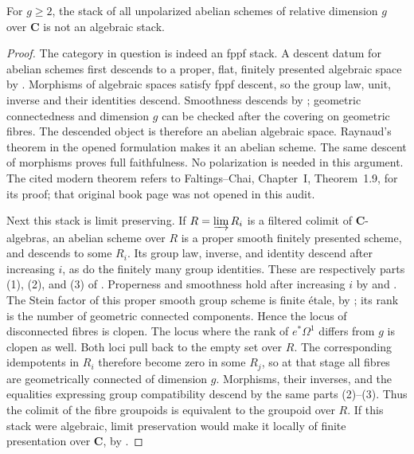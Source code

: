 \begin{proposition}
\label{geo-Ke-unpolarized}
For $g\geq2$, the stack of all unpolarized abelian schemes of relative
dimension $g$ over $\mathbf C$ is not an algebraic stack.
\end{proposition}
\begin{proof}
The category in question is indeed an fppf stack. A descent datum for
abelian schemes first descends to a proper, flat, finitely presented
algebraic space by \cite[Lemma 99.13.3, tag 0D1G]{geoStacksSpacesDescent}.
Morphisms of algebraic spaces satisfy fppf descent, so the group law,
unit, inverse and their identities descend. Smoothness descends by
\cite[Lemma 74.11.26, tag 0429]{geoStacksSmoothFpqc}; geometric
connectedness and dimension $g$ can be checked after the covering on
geometric fibres. The descended object is therefore an abelian algebraic
space. Raynaud's theorem in the opened formulation
\cite[Theorem 2.3.2, p.~12]{RobertAV2023} makes it an abelian scheme.
The same descent of morphisms proves full faithfulness. No polarization
is needed in this argument. The cited modern theorem refers to
Faltings--Chai, Chapter~I, Theorem~1.9, for its proof; that original book
page was not opened in this audit.

Next this stack is limit preserving. If $R=\varinjlim R_i$ is a filtered
colimit of $\mathbf C$-algebras, an abelian scheme over $R$ is a proper
smooth finitely presented scheme, and descends to some $R_i$. Its group
law, inverse, and identity descend after increasing $i$, as do the
finitely many group identities. These are respectively parts (1), (2),
and (3) of \cite[Lemma 32.10.1, tag 01ZM]{geoStacksFpDescent}.
Properness and smoothness hold after increasing $i$ by
\cite[Lemma 32.13.1, tag 081F]{geoStacksProperDescent} and
\cite[Lemma 32.8.9, tag 0C0C]{geoStacksSmoothDescent}.
The Stein factor of this proper smooth group scheme is finite \'etale,
by \cite[Lemma 76.36.9, tag 0E0D]{geoStacksEtaleStein}; its rank is
the number of geometric connected components. Hence the locus of
disconnected fibres is clopen. The locus where the rank of
$e^*\Omega^1$ differs from $g$ is clopen as well. Both loci pull back
to the empty set over $R$. The corresponding idempotents in $R_i$
therefore become zero in some $R_j$, so at that stage all fibres are
geometrically connected of dimension $g$. Morphisms, their inverses,
and the equalities expressing group compatibility descend by the same
parts (2)--(3). Thus the colimit of the fibre groupoids is equivalent to the
groupoid over $R$. If this stack were algebraic, limit preservation would
make it locally of finite presentation over $\mathbf C$, by
\cite[Proposition 102.3.8, tag 0CMY]{geoStacksStackLimits}.


\end{proof}
